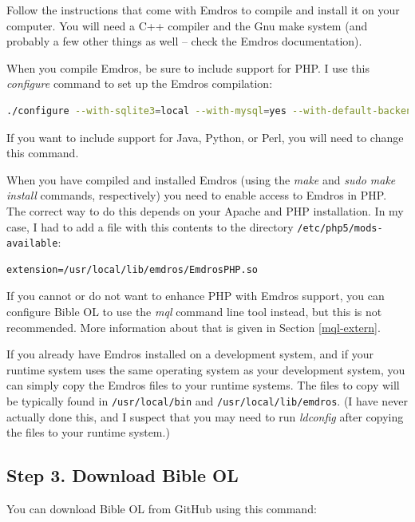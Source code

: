 \documentclass[11pt,oneside,a4paper]{memoir}
\begin{document}
Follow the instructions that come with Emdros to compile and install it on your computer. You will
need a C++ compiler and the Gnu make system (and probably a few other things as well -- check the
Emdros documentation).

When you compile Emdros, be sure to include support for PHP. I use this \emph{configure} command to
set up the Emdros compilation:

\begin{lstlisting}[language=bash]
./configure --with-sqlite3=local --with-mysql=yes --with-default-backend=sqlite3 --with-swig-language-php=yes --with-swig-language-java=no --with-swig-language-python=no --with-swig-language-perl=no
\end{lstlisting}

If you want to include support for Java, Python, or Perl, you will need to change this command.

When you have compiled and installed Emdros (using the \emph{make} and \emph{sudo make install}
commands, respectively) you need to enable access to Emdros in PHP. The correct way to do this
depends on your Apache and PHP installation. In my case, I had to add a file with this contents to
the directory \texttt{/etc/php5/mods-available}:

\begin{lstlisting}
extension=/usr/local/lib/emdros/EmdrosPHP.so
\end{lstlisting}

If you cannot or do not want to enhance PHP with Emdros support, you can configure Bible OL to use
the \emph{mql} command line tool instead, but this is not recommended. More information about that
is given in Section \ref{mql-extern}.

If you already have Emdros installed on a development system, and if your runtime system uses the
same operating system as your development system, you can simply copy the Emdros files to your
runtime systems. The files to copy will be typically found in \texttt{/usr/local/bin} and
\texttt{/usr/local/lib/emdros}. (I have never actually done this, and I suspect that you may need to
run \emph{ldconfig} after copying the files to your runtime system.)


\subsection{Step 3. Download Bible OL}

You can download Bible OL from GitHub using this command:
\end{document}
